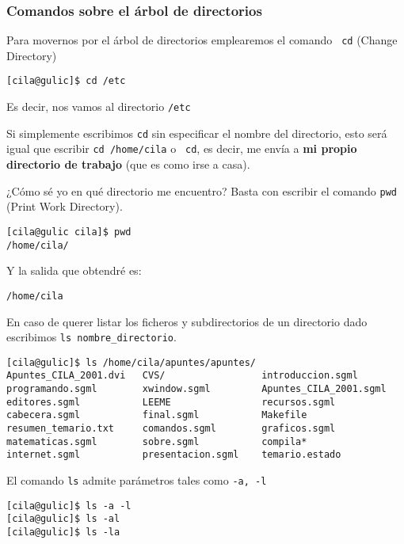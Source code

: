 \subsubsection{Comandos sobre el árbol de directorios}

Para movernos por el árbol  de directorios emplearemos el comando {\tt
cd} ({\sf Change Directory}) 

\begin{verbatim}
[cila@gulic]$ cd /etc
\end{verbatim}

Es decir, nos vamos al directorio {\tt /etc}

Si  simplemente escribimos  {\tt  cd} sin  especificar  el nombre  del
directorio, esto será  igual que escribir {\tt cd  /home/cila} o {\tt
cd}, es decir,  me envía a {\bf mi propio  directorio de trabajo} (que
es como irse a casa).

¿Cómo sé  yo en  qué directorio  me encuentro?  Basta con  escribir el
comando {\tt pwd} ({\sf Print Work Directory}).

\begin{verbatim}
[cila@gulic cila]$ pwd
/home/cila/
\end{verbatim}

Y la salida que obtendré es:

\begin{verbatim}
/home/cila
\end{verbatim}

En  caso   de  querer   listar  los   ficheros  y   subdirectorios  de
un   directorio   dado   escribimos   {\tt   ls   nombre\_directorio}.

\begin{verbatim}
[cila@gulic]$ ls /home/cila/apuntes/apuntes/
Apuntes_CILA_2001.dvi   CVS/                 introduccion.sgml 
programando.sgml        xwindow.sgml         Apuntes_CILA_2001.sgml     
editores.sgml           LEEME                recursos.sgml              
cabecera.sgml           final.sgml           Makefile                   
resumen_temario.txt     comandos.sgml        graficos.sgml
matematicas.sgml        sobre.sgml           compila*                
internet.sgml           presentacion.sgml    temario.estado
\end{verbatim}

El comando {\tt ls} admite parámetros tales como {\tt -a, -l}

\begin{verbatim}
[cila@gulic]$ ls -a -l
[cila@gulic]$ ls -al
[cila@gulic]$ ls -la
\end{verbatim}

